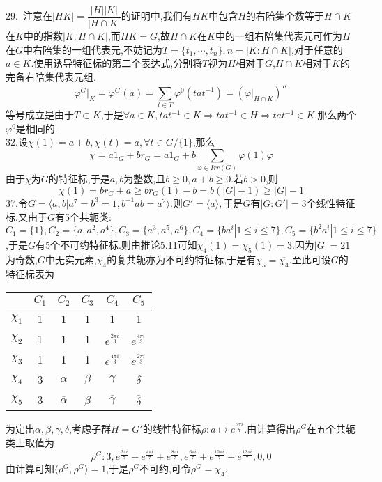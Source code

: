 \documentclass[b5paper]{ctexart}
\begin{document}
\pagestyle{plain}
\noindent
{}
29.~注意在$|HK|=\dfrac{|H||K|}{|H\cap K|}$的证明中,我们有$HK$中包含$H$的右陪集个数等于$H\cap K$在$K$中的指数$|K:H\cap K|$,而$HK=G$,故$H\cap K$在$K$中的一组右陪集代表元可作为$H$在$G$中右陪集的一组代表元,不妨记为$T=\{t_1,\cdots,t_n\},n=|K:H\cap K|$,对于任意的$a\in K$.使用诱导特征标的第二个表达式,分别将$T$视为$H$相对于$G$,$H\cap K$相对于$K$的完备右陪集代表元组.
\[\varphi^G|_K=\varphi^G(a)=\sum_{t\in T}\varphi^0(tat^{-1})=(\varphi|_{H\cap K})^K\]
等号成立是由于$T\subset K$,于是$\forall a\in K,tat^{-1}\in K\Rightarrow tat^{-1}\in H\Leftrightarrow tat^{-1}\in K.$那么两个$\varphi^0$是相同的.\\
32.设$\chi(1)=a+b,\chi(t)=a,\forall t\in G/\{1\}$,那么
\[\chi=a1_G+br_G=a1_G+b\sum\limits_{\varphi\in Irr(G)}\varphi(1)\varphi\]
由于$\chi$为$G$的特征标,于是$a,b$为整数,且$b\geq 0,a+b\geq 0$.若$b>0$,则
\[\chi(1)=br_G+a\geq br_G(1)-b=b(|G|-1)\geq |G|-1\]
37.令$G=\langle a,b|a^7=b^3=1,b^{-1}ab=a^2\rangle.$则$G'=\langle a\rangle,$于是$G$有$|G:G'|=3$个线性特征标.又由于$G$有5个共轭类:$C_1=\{1\},C_2=\{a,a^2,a^4\},C_3=\{a^3,a^5,a^6\},C_4=\{ba^i|1\leq i\leq 7\},C_5=\{b^2a^i|1\leq i\leq 7\}$,于是$G$有5个不可约特征标.则由推论5.11可知$\chi_4(1)=\chi_5(1)=3$.因为$|G|=21$为奇数,$G$中无实元素,$\chi_4$的复共轭亦为不可约特征标,于是有$\chi_5=\overline{\chi_4}$.至此可设$G$的特征标表为
\begin{center}
\begin{tabular}{|c|ccccc|}
\hline
 & $C_1$ &$C_2$ &$C_3$ &$C_4$ &$C_5$ \\\hline
 $\chi_1$& 1& 1 & 1 & 1 & 1\\\hline
 $\chi_2$& 1& 1& 1& $e^{\frac{2\pi i}{3}}$& $e^{\frac{4\pi i}{3}}$\\\hline
 $\chi_3$& 1& 1& 1& $e^{\frac{4\pi i}{3}}$&$e^{\frac{2\pi i}{3}}$ \\\hline
 $\chi_4$& 3&$\alpha$ &$\beta$ & $\gamma$&$\delta$ \\\hline
 $\chi_5$& 3&$\overline{\alpha}$ &$\overline{\beta}$ &$\overline{\gamma}$ &$\overline{\delta}$  \\\hline
\end{tabular}
\end{center}
为定出$\alpha,\beta,\gamma,\delta$,考虑子群$H=G'$的线性特征标$\rho:a\mapsto e^{\frac{2\pi i}{7}}.$由计算得出$\rho^G$在五个共轭类上取值为
\[\rho^G:3,e^{\frac{2\pi i}{7}}+e^{\frac{4\pi i}{7}}+e^{\frac{8\pi i}{7}},e^{\frac{6\pi i}{7}}+e^{\frac{10\pi i}{7}}+e^{\frac{12\pi i}{7}},0,0\]
由计算可知$\langle \rho^G,\rho^G\rangle=1$,于是$\rho^G$不可约,可令$\rho^G=\chi_4$.\\
\end{document}
